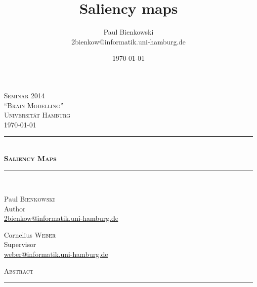 \documentclass[a4paper,12pt,fleqn,oneside]{scrartcl}
\title{Saliency maps}
\author{Paul Bienkowski \\[0.2em] \scriptsize 2bienkow@informatik.uni-hamburg.de}
\date{\today}
\begin{document}
\begin{titlepage}
    \begin{center}

    \textsc{\Large Seminar 2014}\\[0.0cm]
    \textsc{\small ``Brain Modelling''}\\[0.0cm]
    \textsc{\small Universität Hamburg}
    \\[0.5cm]
    \textsc{\today}\\[0.5cm]

    \rule{0.8\textwidth}{0.4pt}
    \\[0.4cm]
    {\huge \bfseries \textsc{Saliency Maps}}
    \\[0.0cm]
    \rule{0.8\textwidth}{0.4pt}\\[1.2cm]

    \begin{minipage}{0.4\textwidth}
        \begin{flushleft} \large
            Paul \textsc{Bienkowski}\\[-0.1cm]
            {\small Author}\\[-0.2cm]
            {\scriptsize \url{2bienkow@informatik.uni-hamburg.de}}
        \end{flushleft}
    \end{minipage}\begin{minipage}{0.4\textwidth}
        \begin{flushright} \large
            Cornelius \textsc{Weber}\\[-0.1cm]
            {\small Supervisor}\\[-0.2cm]
            {\scriptsize \url{weber@informatik.uni-hamburg.de}}
        \end{flushright}
    \end{minipage}

    \vfill

    \textsc{Abstract}\\[-0.0cm]
    \rule{0.8\textwidth}{0.4pt}\\[0.2cm]
    \end{center}

    \begin{minipage}{0.10\textwidth}\-\end{minipage}\begin{minipage}{0.8\textwidth}
    {\small 

}
\end{minipage}
\end{titlepage}
\end{document}
